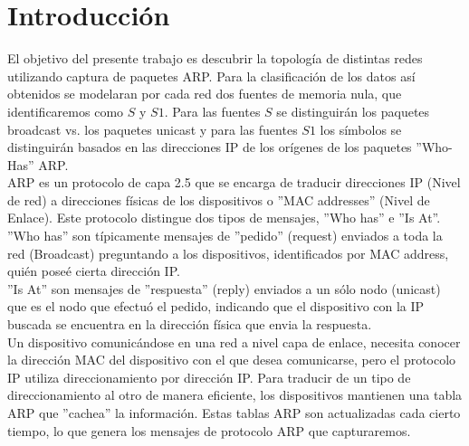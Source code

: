 \section{Introducción}



El objetivo del presente trabajo es descubrir la topología de distintas redes utilizando captura de paquetes ARP. Para la clasificación de los datos así obtenidos se modelaran por cada red dos fuentes de memoria nula, que identificaremos como $S$ y $S1$. Para las fuentes $S$ se distinguirán los paquetes broadcast vs. los paquetes unicast y para las fuentes $S1$ los símbolos se distinguirán basados en las direcciones IP de los orígenes de los paquetes ''Who-Has'' ARP.\\

ARP es un protocolo de capa 2.5 que se encarga de traducir direcciones IP (Nivel de red) a direcciones físicas de los dispositivos o ''MAC addresses'' (Nivel de Enlace). Este protocolo distingue dos tipos de mensajes, ''Who has'' e ''Is At''.\\
''Who has'' son típicamente mensajes de ''pedido'' (request) enviados a toda la red (Broadcast) preguntando a los dispositivos, identificados por MAC address, quién poseé cierta dirección IP.\\
''Is At'' son mensajes de ''respuesta'' (reply) enviados a un sólo nodo (unicast) que es el nodo que efectuó el pedido, indicando que el dispositivo con la IP buscada se encuentra en la dirección física que envia la respuesta.\\

Un dispositivo comunicándose en una red a nivel capa de enlace, necesita conocer la dirección MAC del dispositivo con el que desea comunicarse, pero el protocolo IP utiliza direccionamiento por dirección IP. Para traducir de un tipo de direccionamiento al otro de manera eficiente, los dispositivos mantienen una tabla ARP que ''cachea'' la información. Estas tablas ARP son actualizadas cada cierto tiempo, lo que genera los mensajes de protocolo ARP que capturaremos.\\

